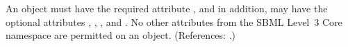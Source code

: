 An \Event object must have the required attribute
, and in addition, may have the optional
attributes , , , and .
No other attributes from the SBML Level~3 Core namespace are permitted on
an \Event object.  (References: .)
